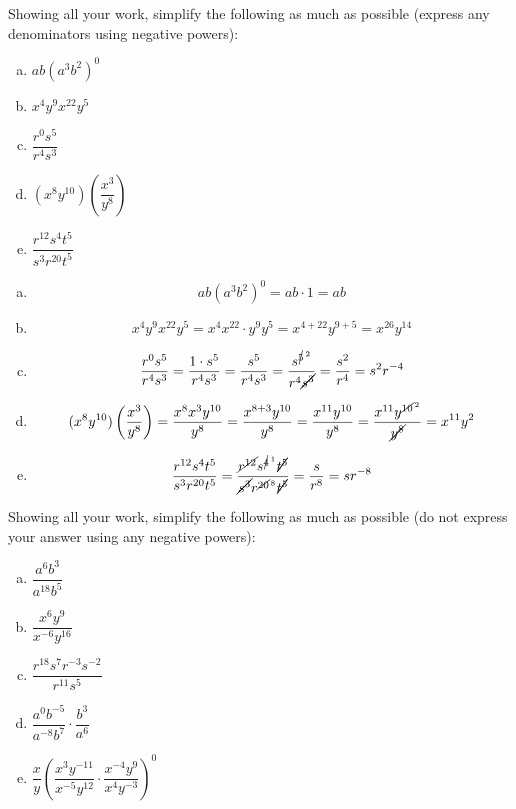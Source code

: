 \documentclass[11pt,letterpaper]{article}
\begin{document}

 Showing all your work, simplify the following as much as possible (express any denominators using negative powers):
	\begin{enumerate}[(a)]
	\item $ab(a^3 b^2)^0$
	\item $x^4 y^9 x^{22} y^5$
	\item $\dfrac{r^0 s^5}{r^4 s^3}$
	\item $(x^8 y^{10}) \left( \dfrac{x^3}{y^8} \right)$
	\item $\dfrac{r^{12} s^4 t^5}{s^3 r^{20} t^5}$
	\end{enumerate} \pspace

\sol 
\begin{enumerate}[(a)]
\item 
	\[
	ab(a^3 b^2)^0= ab \cdot 1= ab
	\] \pspace

\item 
	\[
	x^4 y^9 x^{22} y^5= x^4 x^{22} \cdot y^9 y^5= x^{4+22} y^{9+5}= x^{26} y^{14}
	\] \pspace

\item 
	\[
	\dfrac{r^0 s^5}{r^4 s^3}= \dfrac{1 \cdot s^5}{r^4 s^3}= \dfrac{s^5}{r^4 s^3}= \dfrac{s^{\cancel{5}^{\,2}}}{r^4 \cancel{s^3}}= \dfrac{s^2}{r^4}= s^2 r^{-4}
	\] \pspace

\item 
	\[
	(x^8 y^{10}) \left( \dfrac{x^3}{y^8} \right)= \dfrac{x^8 x^3 y^{10}}{y^8}= \dfrac{x^{8+3} y^{10}}{y^8}= \dfrac{x^{11} y^{10}}{y^8}= \dfrac{x^{11} y^{\cancel{10}^{\,2}}}{\cancel{y^8}}= x^{11} y^2
	\] \pspace

\item 
	\[
	\dfrac{r^{12} s^4 t^5}{s^3 r^{20} t^5}= \dfrac{\cancel{r^{12}} s^{\cancel{4}^{\,1}} \cancel{t^5}}{\cancel{s^3} r^{\cancel{20}^{\,8}} \cancel{t^5}}= \dfrac{s}{r^8}= s r^{-8}
	\]
\end{enumerate}



\newpage



 Showing all your work, simplify the following as much as possible (do not express your answer using any negative powers): 
	\begin{enumerate}[(a)]
	\item $\dfrac{a^6 b^3}{a^{18} b^5}$
	\item $\dfrac{x^6 y^9}{x^{-6} y^{16}}$
	\item $\dfrac{r^{18} s^7 r^{-3} s^{-2}}{ r^{11} s^5}$
	\item $\dfrac{a^0 b^{-5}}{a^{-8} b^7} \cdot \dfrac{b^3}{a^6}$
	\item $\dfrac{x}{y} \left( \dfrac{x^3 y^{-11}}{x^{-5} y^{12}} \cdot \dfrac{x^{-4} y^9}{x^4 y^{-3}} \right)^0$
	\end{enumerate} \pspace
\end{document}
